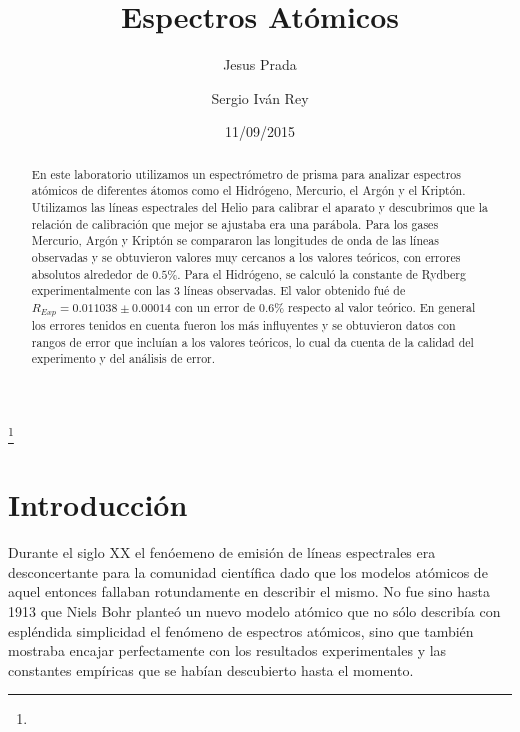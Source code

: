 \documentclass[%
 reprint,
 amsmath,amssymb,
 aps,
]{revtex4-1}
\begin{document}

\title{Espectros Atómicos}%
\thanks{}%

\author{Jesus Prada}
\author{Sergio Iv\'an Rey}%
%

\date{11/09/2015}%

\begin{abstract}
En este laboratorio utilizamos un espectrómetro de prisma para analizar espectros atómicos de diferentes átomos como el Hidrógeno, Mercurio, el Argón y el Kriptón. Utilizamos las líneas espectrales del Helio para calibrar el aparato y descubrimos que la relación de calibración que mejor se ajustaba era una parábola. Para los gases Mercurio, Argón y Kriptón se compararon las longitudes de onda de las líneas observadas y se obtuvieron valores muy cercanos a los valores teóricos, con errores absolutos alrededor de $0.5\%$. Para el Hidrógeno, se calculó la constante de Rydberg experimentalmente con las 3 líneas observadas. El valor obtenido fué de $R_{Exp} = 0.011038 \pm 0.00014$ con un error de $0.6\%$ respecto al valor teórico. En general los errores tenidos en cuenta fueron los más influyentes y se obtuvieron datos con rangos de error que incluían a los valores teóricos, lo cual da cuenta de la calidad del experimento y del análisis de error.\\
\end{abstract}


\maketitle


\section{\label{sec:level1}Introducci\'on}

Durante el siglo XX el fenóemeno de emisión de líneas espectrales era desconcertante para la comunidad científica dado que los modelos atómicos de aquel entonces fallaban rotundamente en describir el mismo. No fue sino hasta 1913 que Niels Bohr planteó un nuevo modelo atómico que no sólo describía con espléndida simplicidad el fenómeno de espectros atómicos, sino que también mostraba encajar perfectamente con los resultados experimentales y las constantes empíricas que se habían descubierto hasta el momento. \\ 
\end{document}
